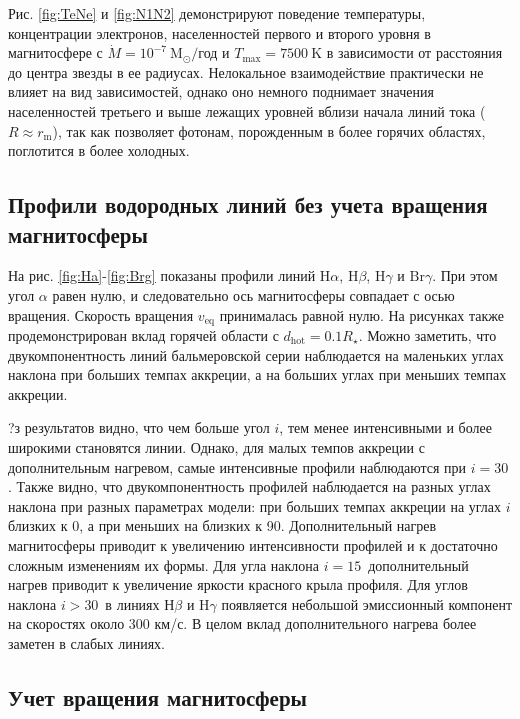 \documentclass{article}
\begin{document}
\FloatBarrier

Рис. \ref{fig:TeNe} и \ref{fig:N1N2} демонстрируют поведение температуры, концентрации электронов, населенностей первого и второго уровня в магнитосфере с $\dot{M} = 10^{-7}\ \text{M}_\odot/$год и $T_\text{max} = 7500\ \text{K}$ в зависимости от расстояния до центра звезды в ее радиусах. Нелокальное взаимодействие практически не влияет на вид зависимостей, однако оно немного поднимает значения населенностей третьего и выше лежащих уровней вблизи начала линий тока ($R \approx r_\text{m}$), так как позволяет фотонам, порожденным в более горячих областях, поглотится в более холодных.

\FloatBarrier
\subsection{Профили водородных линий без учета вращения магнитосферы}

На рис. \ref{fig:Ha}-\ref{fig:Brg} показаны профили линий $\text{H}\alpha$, $\text{H}\beta$, $\text{H}\gamma$ и $\text{Br}\gamma$. При этом угол $\alpha$ равен нулю, и следовательно ось магнитосферы совпадает с осью вращения. Скорость вращения $v_\text{eq}$ принималась равной нулю. На рисунках также продемонстрирован вклад горячей области с $d_\text{hot} = 0.1 R_\star$. Можно заметить, что двукомпонентность линий бальмеровской серии наблюдается на маленьких углах наклона при больших темпах аккреции, а на больших углах при меньших темпах аккреции.

\FloatBarrier

?з результатов видно, что чем больше угол $i$, тем менее интенсивными и более широкими становятся линии. Однако, для малых темпов аккреции с дополнительным нагревом, самые интенсивные профили наблюдаются при $i=30$\degree. Также видно, что двукомпонентность профилей наблюдается на разных углах наклона при разных параметрах модели: при больших темпах аккреции на углах $i$ близких к 0\degree, а при меньших на близких к 90\degree. Дополнительный нагрев магнитосферы приводит к увеличению интенсивности профилей и к достаточно сложным изменениям их формы. Для угла наклона $i=15$\degree\ дополнительный нагрев приводит к увеличение яркости красного крыла профиля. Для углов наклона $i > 30$\degree\ в линиях Н$\beta$ и H$\gamma$ появляется небольшой эмиссионный компонент на скоростях около 300 км/с. В целом вклад дополнительного нагрева более заметен в слабых линиях. 

\subsection{Учет вращения магнитосферы}
\end{document}
